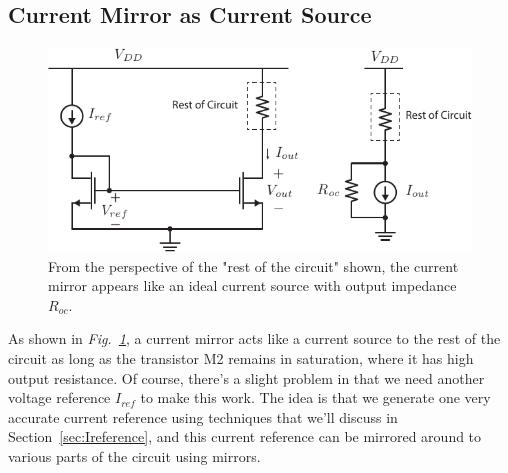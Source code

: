 \subsection{Current Mirror as Current Source}
\begin{figure}[tb]
\centering
\includegraphics[scale=1]{7mirror_current_source.pdf}
\caption{From the perspective of the "rest of the circuit" shown, the current mirror appears like an ideal current source with output impedance $R_{oc}$.}
\label{fig:7mirror_current_source.pdf}
\end{figure}
As shown in \emph{Fig.~\ref{fig:7mirror_current_source.pdf}}, a current mirror acts like a current source to the rest of the circuit as long as the transistor M2 remains in saturation, where it has high output resistance.  Of course, there's a slight problem in that we need another voltage reference $I_{ref}$ to make this work.  The idea is that we generate one very accurate current reference using techniques that we'll discuss in Section~\ref{sec:Ireference}, and this current reference can be mirrored around to various parts of the circuit using mirrors.  
